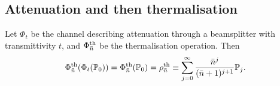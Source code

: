 \documentclass[12pt]{report}
\newcommand{\PP}{\mathbb{P}}
\begin{document}

\subsection{Attenuation and then thermalisation}

\begin{prop}
	Let $\Phi_t$ be the channel describing attenuation through a beamsplitter with transmittivity $t$, and $\Phi_{\bar n}^{\rm th}$ be the thermalisation operation. Then
	\begin{equation}
	\Phi^{\rm th}_{\bar n}(\Phi_t(\PP_0))
	= \Phi^{\rm th}_{\bar n}(\PP_0)
	= \rho^{\rm th}_{\bar n}
	\equiv \sum_{j=0}^\infty \frac{\bar n^j}{(\bar n + 1)^{j+1}} \PP_j.
	\end{equation}
\end{prop}
\end{document}
